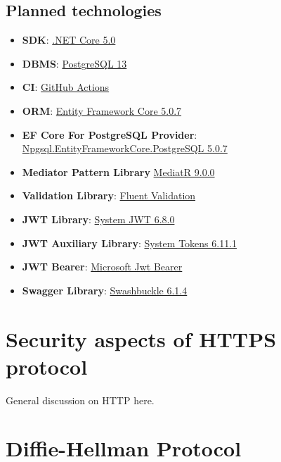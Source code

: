 \subsection{Planned technologies}\label{subsec:planned-technologies}
\begin{itemize}
    \item \textbf{SDK}: \href{https://dotnet.microsoft.com/download/dotnet/5.0}{.NET Core 5.0}
    \item \textbf{DBMS}: \href{https://www.postgresql.org/}{PostgreSQL 13}
    \item \textbf{CI}: \href{https://docs.github.com/en/actions}{GitHub Actions}
    \item \textbf{ORM}: \href{https://www.nuget.org/packages/Microsoft.EntityFrameworkCore/5.0.7?_src=template}{Entity Framework Core 5.0.7}
    \item \textbf{EF Core For PostgreSQL Provider}: \href{https://www.nuget.org/packages/Npgsql.EntityFrameworkCore.PostgreSQL/5.0.7?_src=template}{Npgsql.EntityFrameworkCore.PostgreSQL 5.0.7}
    \item \textbf{Mediator Pattern Library} \href{https://www.nuget.org/packages/MediatR/9.0.0?_src=template}{MediatR 9.0.0}
    \item \textbf{Validation Library}: \href{https://www.nuget.org/packages/FluentValidation/10.2.3?_src=template}{Fluent Validation}
    \item \textbf{JWT Library}: \href{https://www.nuget.org/packages/System.IdentityModel.Tokens.Jwt}{System JWT 6.8.0}
    \item \textbf{JWT Auxiliary Library}: \href{https://www.nuget.org/packages/System.IdentityModel.Tokens}{System Tokens 6.11.1}
    \item \textbf{JWT Bearer}: \href{https://www.nuget.org/packages/Microsoft.AspNetCore.Authentication.JwtBearer/5.0.7?_src=template}{Microsoft Jwt Bearer}
    \item \textbf{Swagger Library}: \href{https://www.nuget.org/packages/Swashbuckle.AspNetCore/5.6.3?_src=template}{Swashbuckle 6.1.4}
\end{itemize}


\section{Security aspects of HTTPS protocol}\label{sec:security-aspects-of-https-protocol}
General discussion on HTTP here.


\section{Diffie-Hellman Protocol}\label{sec:diffie-hellman-protocol}

